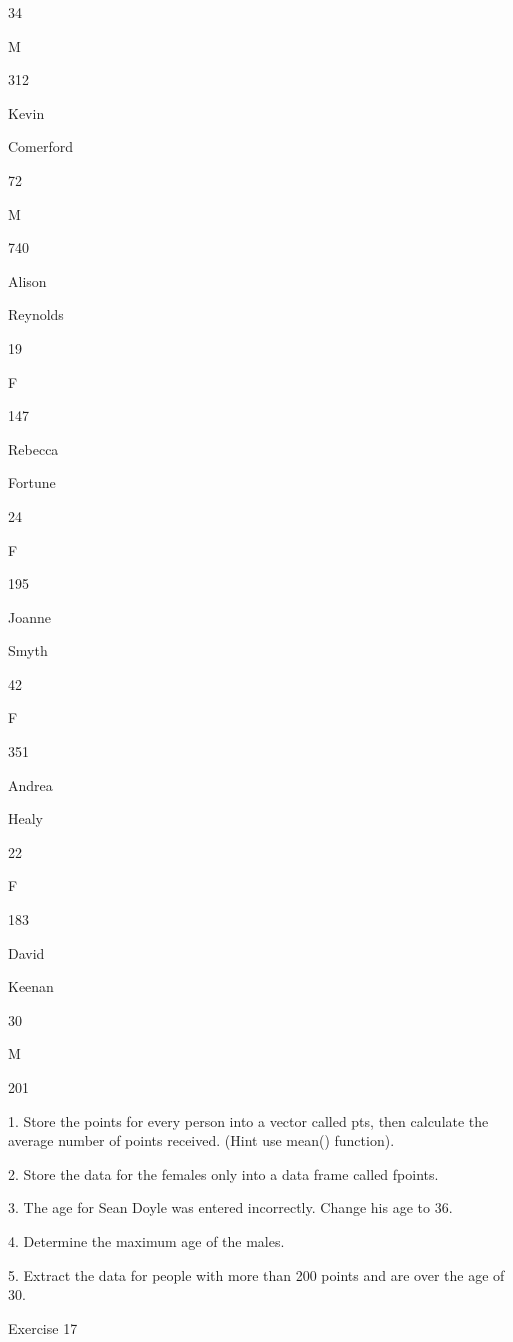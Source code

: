 34
 

M
 

312
 



Kevin
 

Comerford
 

72
 

M
 

740
 



Alison
 

Reynolds
 

19
 

F
 

147
 



Rebecca
 

Fortune
 

24
 

F
 

195
 



Joanne
 

Smyth
 

42
 

F
 

351
 



Andrea
 

Healy
 

22
 

F
 

183
 



David
 

Keenan
 

30
 

M
 

201
 

 
1.
Store the points for every person into a vector called pts, then calculate the average number of points received. (Hint use mean() function).

2.
Store the data for the females only into a data frame called fpoints.

3.
The age for Sean Doyle was entered incorrectly. Change his age to 36.

4.
Determine the maximum age of the males.

5.
Extract the data for people with more than 200 points and are over the age of 30.


 

Exercise 17

 


